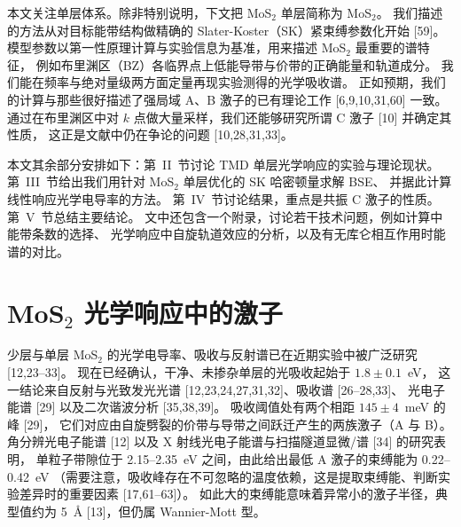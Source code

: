 \documentclass[11pt,a4paper]{ctexart}
\begin{document}
本文关注单层体系。除非特别说明，下文把 MoS$_2$ 单层简称为 MoS$_2$。
我们描述的方法从对目标能带结构做精确的 Slater-Koster（SK）紧束缚参数化开始 [59]。
模型参数以第一性原理计算与实验信息为基准，用来描述 MoS$_2$ 最重要的谱特征，
例如布里渊区（BZ）各临界点上低能导带与价带的正确能量和轨道成分。
我们能在频率与绝对量级两方面定量再现实验测得的光学吸收谱。
正如预期，我们的计算与那些很好描述了强局域 A、B 激子的已有理论工作 [6,9,10,31,60] 一致。
通过在布里渊区中对 $k$ 点做大量采样，我们还能够研究所谓 C 激子 [10] 并确定其性质，
这正是文献中仍在争论的问题 [10,28,31,33]。

本文其余部分安排如下：第~II~节讨论 TMD 单层光学响应的实验与理论现状。
第~III~节给出我们用针对 MoS$_2$ 单层优化的 SK 哈密顿量求解 BSE、
并据此计算线性响应光学电导率的方法。
第~IV~节讨论结果，重点是共振 C 激子的性质。第~V~节总结主要结论。
文中还包含一个附录，讨论若干技术问题，例如计算中能带条数的选择、
光学响应中自旋轨道效应的分析，以及有无库仑相互作用时能谱的对比。

\section{MoS$_2$ 光学响应中的激子}

少层与单层 MoS$_2$ 的光学电导率、吸收与反射谱已在近期实验中被广泛研究 [12,23--33]。
现在已经确认，干净、未掺杂单层的光吸收起始于 $1.8\pm0.1$~eV，
这一结论来自反射与光致发光光谱 [12,23,24,27,31,32]、吸收谱 [26--28,33]、
光电子能谱 [29] 以及二次谐波分析 [35,38,39]。
吸收阈值处有两个相距 $145\pm4$~meV 的峰 [29]，
它们对应由自旋劈裂的价带与导带之间跃迁产生的两族激子（A 与 B）。
角分辨光电子能谱 [12] 以及 X 射线光电子能谱与扫描隧道显微/谱 [34] 的研究表明，
单粒子带隙位于 2.15--2.35~eV 之间，由此给出最低 A 激子的束缚能为 0.22--0.42~eV
（需要注意，吸收峰存在不可忽略的温度依赖，这是提取束缚能、判断实验差异时的重要因素 [17,61--63]）。
如此大的束缚能意味着异常小的激子半径，典型值约为 5~\AA{} [13]，但仍属 Wannier-Mott 型。
\end{document}
